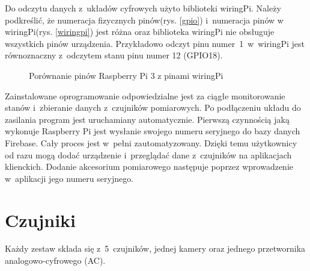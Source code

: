 Do odczytu danych z~układów cyfrowych użyto biblioteki wiringPi. Należy podkreślić, że numeracja fizycznych pinów(rys. \ref{gpio}) i~numeracja pinów w wiringPi(rys. \ref{wiringpi}) jest różna oraz biblioteka wiringPi nie obsługuje wszystkich pinów urządzenia. Przykładowo odczyt pinu numer~1~w~wiringPi jest równoznaczny z~odczytem stanu pinu numer 12 (GPIO18).
\begin{figure}[H]
    \centering
    \hspace{3cm} 
    \caption{Porównanie pinów Raspberry Pi 3 \cite{gpio} z pinami wiringPi \cite{wiringpi}}
    \label{piny}
\end{figure}

Zainstalowane oprogramowanie odpowiedzialne jest za ciągłe monitorowanie stanów i~zbieranie danych z~czujników pomiarowych. Po podłączeniu układu do zasilania program jest uruchamiany automatycznie. Pierwszą czynnością jaką wykonuje Raspberry Pi jest wysłanie swojego numeru seryjnego do bazy danych Firebase. Cały proces jest w~pełni zautomatyzowany. Dzięki temu użytkownicy od razu mogą dodać urządzenie i~przeglądać dane z~czujników na aplikacjach klienckich. Dodanie akcesorium pomiarowego następuje poprzez wprowadzenie w~aplikacji jego numeru seryjnego.
\section{Czujniki}
Każdy zestaw składa się z~5~czujników, jednej kamery oraz jednego przetwornika analogowo-cyfrowego (AC). 
